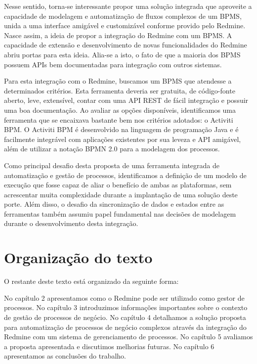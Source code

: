 Nesse sentido, torna-se interessante propor uma solução integrada que aproveite a capacidade de modelagem e automatização de fluxos complexos de um BPMS, unida a uma interface amigável e customizável conforme provido pelo Redmine. Nasce assim, a ideia de propor a integração do Redmine com um BPMS. A capacidade de extensão e desenvolvimento de novas funcionalidades do Redmine abriu portas para esta ideia. Alia-se a isto, o fato de que a maioria dos BPMS possuem APIs\cite{api} bem documentadas para integração com outros sistemas.

Para esta integração com o Redmine, buscamos um BPMS que atendesse a determinados critérios. Esta ferramenta deveria ser gratuita, de código-fonte aberto, leve, extensível, contar com uma API\cite{api} REST\cite{rest} de fácil integração e possuir uma boa documentação. Ao avaliar as opções disponíveis, identificamos uma ferramenta que se encaixava bastante bem nos critérios adotados: o Activiti BPM. O Activiti BPM é desenvolvido na linguagem de programação Java\cite{java-history} e é facilmente integrável com aplicações existentes por sua leveza e API\cite{api} amigável, além de utilizar a notação BPMN 2.0\cite{bpmn20} para a modelagem dos processos.

Como principal desafio desta proposta de uma ferramenta integrada de automatização e gestão de processos, identificamos a definição de um modelo de execução que fosse capaz de aliar o benefício de ambas as plataformas, sem acrescentar muita complexidade durante a implantação de uma solução deste porte. Além disso, o desafio da sincronização de dados e estados entre as ferramentas também assumiu papel fundamental nas decisões de modelagem durante o desenvolvimento desta integração.


\section{Organização do texto}\label{sec:introducao-organizacao_texto}

O restante deste texto está organizado da seguinte forma: 

No capítulo 2 apresentamos como o Redmine pode ser utilizado como gestor de processos. No capítulo 3 introduzimos informações importantes sobre o contexto de gestão de processos de negócio. No capítulo 4 detalhamos a solução proposta para automatização de processos de negócio complexos através da integração do Redmine com um sistema de gerenciamento de processos. No capítulo 5 avaliamos a proposta apresentada e discutimos melhorias futuras. No capítulo 6 apresentamos as conclusões do trabalho.